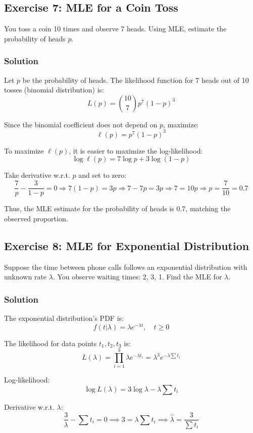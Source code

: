 \documentclass{book}
\begin{document}
\subsection*{Exercise 7: MLE for a Coin Toss}
You toss a coin 10 times and observe 7 heads. Using MLE, estimate the probability of heads $p$.

\subsubsection*{Solution}
Let $p$ be the probability of heads. The likelihood function for 7 heads out of 10 tosses (binomial distribution) is:
\[
L(p) = \binom{10}{7} p^7 (1-p)^3
\]

Since the binomial coefficient does not depend on $p$, maximize:
\[
\ell(p) = p^7 (1-p)^3
\]

To maximize $\ell(p)$, it is easier to maximize the log-likelihood:
\[
\log \ell(p) = 7 \log p + 3 \log (1-p)
\]

Take derivative w.r.t. $p$ and set to zero:
\[
\frac{7}{p} - \frac{3}{1-p} = 0
\Rightarrow 7(1-p) = 3p
\Rightarrow 7 - 7p = 3p
\Rightarrow 7 = 10p
\Rightarrow p = \frac{7}{10} = 0.7
\]

Thus, the MLE estimate for the probability of heads is 0.7, matching the observed proportion.

\subsection*{Exercise 8: MLE for Exponential Distribution}
Suppose the time between phone calls follows an exponential distribution with unknown rate $\lambda$. You observe waiting times: 2, 3, 1. Find the MLE for $\lambda$.

\subsubsection*{Solution}
The exponential distribution’s PDF is:
\[
f(t|\lambda) = \lambda e^{-\lambda t}, \quad t \geq 0
\]

The likelihood for data points $t_1, t_2, t_3$ is:
\[
L(\lambda) = \prod_{i=1}^3 \lambda e^{-\lambda t_i} = \lambda^3 e^{-\lambda \sum t_i}
\]

Log-likelihood:
\[
\log L(\lambda) = 3 \log \lambda - \lambda \sum t_i
\]

Derivative w.r.t. $\lambda$:
\[
\frac{3}{\lambda} - \sum t_i = 0 \implies 3 = \lambda \sum t_i \implies \hat{\lambda} = \frac{3}{\sum t_i}
\]
\end{document}
